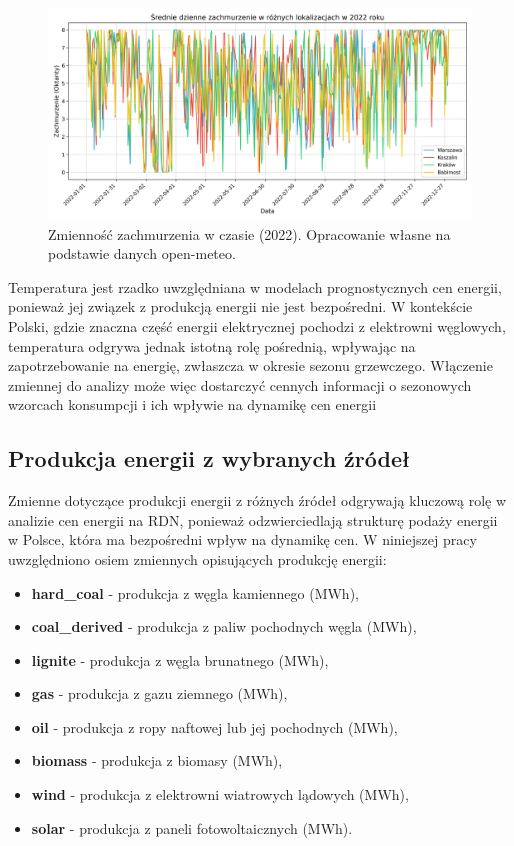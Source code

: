 \begin{figure}[H]
    \centering
    \includegraphics[width=\textwidth]{../plots/weather/cloud_cover_time_series_2022.png}
    \caption{Zmienność zachmurzenia w czasie (2022). Opracowanie własne na podstawie danych open-meteo.}
    \label{fig:cloud-cover-time-series-2022}
\end{figure}

Temperatura jest rzadko uwzględniana w modelach prognostycznych cen energii, ponieważ jej związek z produkcją energii nie jest bezpośredni. W kontekście Polski, gdzie znaczna część energii elektrycznej pochodzi z elektrowni węglowych, temperatura odgrywa jednak istotną rolę pośrednią, wpływając na zapotrzebowanie na energię, zwłaszcza w okresie sezonu grzewczego. Włączenie zmiennej do analizy może więc dostarczyć cennych informacji o sezonowych wzorcach konsumpcji i ich wpływie na dynamikę cen energii

\subsection{Produkcja energii z wybranych źródeł}
Zmienne dotyczące produkcji energii z różnych źródeł odgrywają kluczową rolę w analizie cen energii na RDN, ponieważ odzwierciedlają strukturę podaży energii w Polsce, która ma bezpośredni wpływ na dynamikę cen. W niniejszej pracy uwzględniono osiem zmiennych opisujących produkcję energii: 
\begin{itemize}
    \item \textbf{hard\_coal} - produkcja z węgla kamiennego (MWh),
    \item \textbf{coal\_derived} - produkcja z paliw pochodnych węgla (MWh),
    \item \textbf{lignite} - produkcja z węgla brunatnego (MWh),
    \item \textbf{gas} - produkcja z gazu ziemnego (MWh),
    \item \textbf{oil} - produkcja z ropy naftowej lub jej pochodnych (MWh),
    \item \textbf{biomass} - produkcja z biomasy (MWh),
    \item \textbf{wind} - produkcja z elektrowni wiatrowych lądowych (MWh),
    \item \textbf{solar} - produkcja z paneli fotowoltaicznych (MWh).
\end{itemize}

